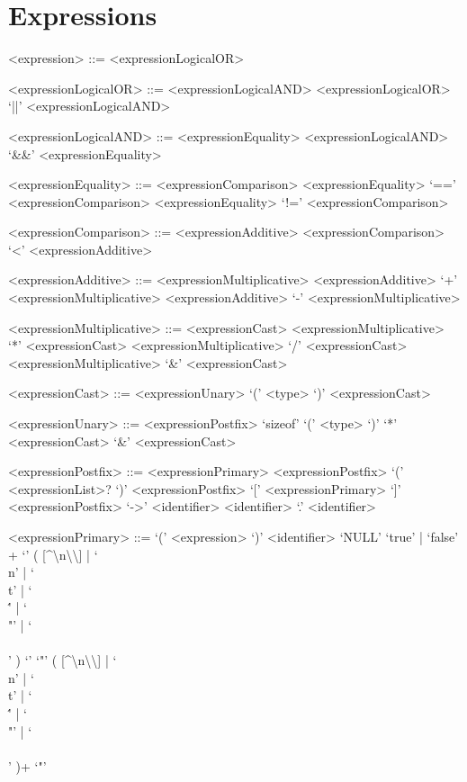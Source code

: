 \section{Expressions}

\setlength{\grammarparsep}{20pt plus 1pt minus 1pt}
\setlength{\grammarindent}{10em}
\begin{grammar}

<expression> ::= <expressionLogicalOR>

<expressionLogicalOR> ::= <expressionLogicalAND>
\alt <expressionLogicalOR> `||' <expressionLogicalAND>

<expressionLogicalAND> ::= <expressionEquality>
\alt <expressionLogicalAND> `&&' <expressionEquality>

<expressionEquality> ::= <expressionComparison>
\alt <expressionEquality> `==' <expressionComparison>
\alt <expressionEquality> `!=' <expressionComparison>

<expressionComparison> ::= <expressionAdditive>
\alt <expressionComparison> `<' <expressionAdditive>

<expressionAdditive> ::= <expressionMultiplicative>
\alt <expressionAdditive> `+' <expressionMultiplicative>
\alt <expressionAdditive> `-' <expressionMultiplicative>

<expressionMultiplicative> ::= <expressionCast>
\alt <expressionMultiplicative> `*' <expressionCast>
\alt <expressionMultiplicative> `/' <expressionCast>
\alt <expressionMultiplicative> `&' <expressionCast>

<expressionCast> ::= <expressionUnary>
\alt `(' <type> `)' <expressionCast>

<expressionUnary> ::= <expressionPostfix>
\alt `sizeof' `(' <type> `)'
\alt `*' <expressionCast>
\alt `&' <expressionCast>

<expressionPostfix> ::= <expressionPrimary>
\alt <expressionPostfix> `(' <expressionList>? `)'
\alt <expressionPostfix> `[' <expressionPrimary> `]'
\alt <expressionPostfix> `->' <identifier>
\alt <identifier> `.' <identifier>

<expressionPrimary> ::= `(' <expression> `)'
\alt <identifier>
\alt `NULL'
\alt `true' | `false'
\alt [0-9]+
\alt `\textquotesingle' ( [\^{}\textquotesingle\textbackslash n\textbackslash\textbackslash] | `\\n' | `\\t' | `\\\'' | `\\"' | `\\\\' ) `\textquotesingle'
\alt `"' ( [\^{}\textquotedbl\textbackslash n\textbackslash\textbackslash] | `\\n' | `\\t' | `\\\'' | `\\"' | `\\\\' )+ `"'

\end{grammar}
